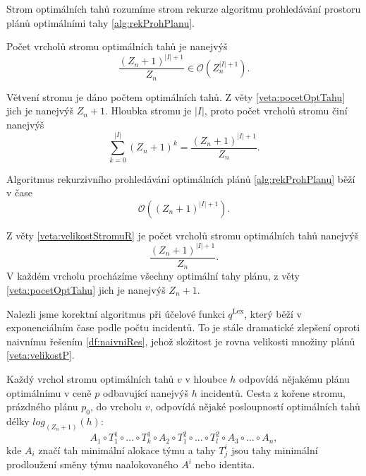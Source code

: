 \begin{definice}
  Strom optimálních tahů rozumíme strom rekurze algoritmu prohledávání prostoru plánů optimálními tahy \ref{alg:rekProhPlanu}.
\end{definice}

\begin{veta}\label{veta:velikostStromuR}
Počet vrcholů stromu optimálních tahů je nanejvýš
  \begin{equation*}
    \frac{(Z_n + 1)^{|I| + 1}}{Z_n} \in \mathcal{O} \left (Z_n^{|I| + 1} \right ).
  \end{equation*}
\end{veta}
\begin{dukaz}
  Větvení stromu je dáno počtem optimálních tahů.
  Z věty \ref{veta:pocetOptTahu} jich je nanejvýš $Z_n + 1$.
  Hloubka stromu je $|I|$, proto
  počet vrcholů stromu činí nanejvýš
  \begin{equation*}
    \sum_{k=0}^{|I|} (Z_n + 1)^{k} = \frac{(Z_n + 1)^{|I| + 1}}{Z_n}.
  \end{equation*}
\end{dukaz}

\begin{veta}\label{veta:slozitostRek}
  Algoritmus rekurzivního prohledávání optimálních plánů \ref{alg:rekProhPlanu} běží v čase
  \begin{equation*}
    \mathcal{O}((Z_n + 1)^{|I| + 1}).
  \end{equation*}
\end{veta}
\begin{dukaz}
  Z věty \ref{veta:velikostStromuR} je počet vrcholů stromu optimálních tahů nanejvýš
  \begin{equation*}
    \frac{(Z_n + 1)^{|I| + 1}}{Z_n}.
  \end{equation*}
  V každém vrcholu procházíme všechny optimální tahy plánu, z věty \ref{veta:pocetOptTahu} jich je nanejvýš $Z_n + 1$.
\end{dukaz}

Nalezli jsme korektní algoritmus při účelové funkci $q^{\text{Lex}}$, který běží v exponenciálním čase podle počtu incidentů. 
To je stále dramatické zlepšení oproti naivnímu řešením \ref{df:naivniRes}, jehož složitost je rovna velikosti množiny plánů \ref{veta:velikostP}.

Každý vrchol stromu optimálních tahů $v$ v hloubce $h$ odpovídá nějakému plánu optimálnímu v ceně $p$ odbavující nanejvýš $h$ incidentů.
Cesta z kořene stromu, prázdného plánu $p_0$, do vrcholu $v$, odpovídá nějaké posloupností optimálních tahů délky $log_{(Z_n + 1)}(h)$:
\begin{equation*}
  A_1 \circ T^1_1 \circ \dots \circ T^1_k \circ A_2 \circ T^2_1 \circ \dots \circ T^2_l \circ A_3 \circ \dots \circ A_n,
\end{equation*}
kde $A_i$ značí tah minimální alokace týmu a tahy $T^i_j$ jsou tahy minimální prodloužení směny týmu naalokovaného $A^i$ nebo identita.

